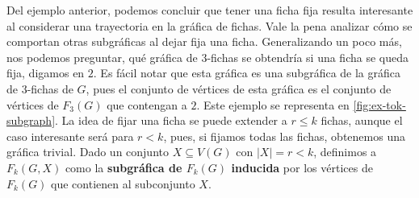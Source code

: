 Del ejemplo anterior, podemos concluir que tener una ficha fija resulta
interesante al considerar una trayectoria en la gr\'afica de fichas. Vale la
pena analizar c\'omo se comportan otras subgr\'aficas al dejar fija una ficha.
Generalizando un poco m\'as, nos podemos preguntar, qu\'e gr\'afica de
$3$-fichas se obtendr\'ia si una ficha se queda fija, digamos en $2$. Es f\'acil
notar que esta gr\'afica es una subgr\'afica de la gr\'afica de $3$-fichas de
$G$, pues el conjunto de v\'ertices de esta gr\'afica es el conjunto de
v\'ertices de $F_3(G)$ que contengan a $2$. Este ejemplo se representa en
\cref{fig:ex-tok-subgraph}. La idea de fijar una ficha se puede extender a
$r\leq k$ fichas, aunque el caso interesante ser\'a para $r<k$, pues, si fijamos
todas las fichas, obtenemos una gr\'afica trivial. Dado un conjunto $X \subseteq
V(G)$ con $|X|=r<k$, definimos a $F_k(G,X)$ como la \textbf{subgr\'afica de
$F_k(G)$ inducida} por los v\'ertices de $F_k(G)$ que
contienen al subconjunto $X$. 

